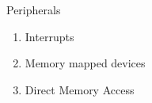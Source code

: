 \documentclass{beamer}
\begin{document}
\begin{frame}{Peripherals}
  \begin{enumerate}
  \item<1-> Interrupts
  \item<2-> Memory mapped devices
  \item<4-> Direct Memory Access
\end{enumerate}
\end{frame}
\end{document}
